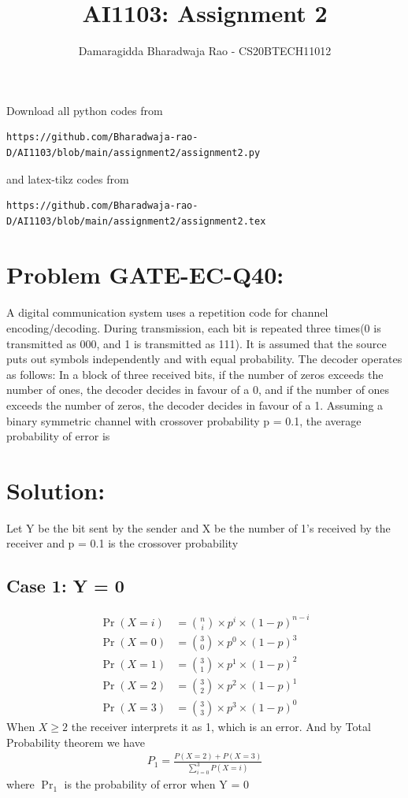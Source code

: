 \documentclass[journal,12pt,twocolumn]{IEEEtran}
\begin{document}
     \def\rightbox#1{\makebox[0in][r]{#1}}
     \def\centbox#1{\makebox[0in]{#1}}
     \def\topbox#1{\raisebox{-\baselineskip}[0in][0in]{#1}}
     \def\midbox#1{\raisebox{-0.5\baselineskip}[0in][0in]{#1}}
\vspace{3cm}
\title{AI1103: Assignment 2}
\author{Damaragidda Bharadwaja Rao - CS20BTECH11012}
\maketitle
\newpage
\bigskip
\renewcommand{\thefigure}{\theenumi}
\renewcommand{\thetable}{\theenumi}
Download all python codes from 
\begin{lstlisting}
https://github.com/Bharadwaja-rao-D/AI1103/blob/main/assignment2/assignment2.py
\end{lstlisting}
%
and latex-tikz codes from 
%
\begin{lstlisting}
https://github.com/Bharadwaja-rao-D/AI1103/blob/main/assignment2/assignment2.tex
\end{lstlisting}
\section*{Problem GATE-EC-Q40: }
A digital communication system uses a
repetition code for channel
encoding/decoding. During transmission, each
bit is repeated three times(0 is transmitted as
000, and 1 is transmitted as 111). It is
assumed that the source puts out symbols
independently and with equal probability. The
decoder operates as follows: In a block of three
received bits, if the number of zeros exceeds the
number of ones, the decoder decides in favour of
a 0, and if the number of ones exceeds the
number of zeros, the decoder decides in favour
of a 1. Assuming a binary symmetric channel
with crossover probability p = 0.1, the average
probability of error is
\section*{Solution:}
Let Y be the bit sent by the sender and X be the number of 1's received by the receiver and p = 0.1 is the crossover probability
\subsection*{Case 1: Y = 0}

\begin{align}
    \Pr(X = i) &= \binom{n}{i}\times p^i\times (1-p)^{n-i}\\
\Pr(X = 0) &= \binom{3}{0}\times p^0\times (1-p)^{3}\\
\Pr(X = 1) &= \binom{3}{1}\times p^1\times (1-p)^{2}\\
\Pr(X = 2) &= \binom{3}{2}\times p^2\times (1-p)^{1}\\
\Pr(X = 3) &= \binom{3}{3}\times p^3\times (1-p)^{0}
\end{align}
When $X \geq 2 $ the receiver interprets it as 1, which is an error. And by Total Probability theorem we have\\
\begin{align}
P_1 = \frac{P(X = 2) + P(X = 3)}{\sum_{i=0}^3P(X = i)}
\end{align}
where $\Pr_1$ is the probability of error when Y = 0
\end{document}
